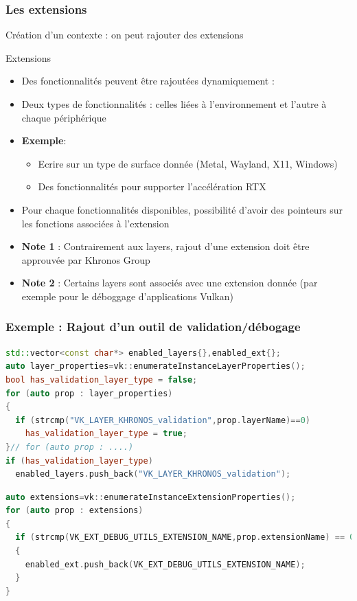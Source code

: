 \documentclass{beamer}
\begin{document}
\begin{frame}[fragile]
\frametitle{Les extensions}

Création d'un contexte : on peut rajouter des extensions 

\begin{exampleblock}{Extensions}
\begin{itemize}
\item Des fonctionnalités peuvent être rajoutées dynamiquement :
\item Deux types de fonctionnalités : celles liées à l'environnement et l'autre à chaque périphérique
\item \textcolor{NavyBlue}{\bf Exemple}:
\begin{itemize}
    \item Ecrire sur un type de surface donnée (Metal, Wayland, X11, Windows)
    \item Des fonctionnalités pour supporter l'accélération RTX
\end{itemize}
\item Pour chaque fonctionnalités disponibles, possibilité d'avoir des pointeurs sur les fonctions associées à l'extension
\item \textbf{\textcolor{BrickRed}{Note 1}} : Contrairement aux layers, rajout d'une extension doit être approuvée par Khronos Group
\item \textbf{\textcolor{BrickRed}{Note 2}} : Certains layers sont associés avec une extension donnée (par exemple pour le déboggage d'applications Vulkan)
\end{itemize}
\end{exampleblock}
\end{frame}

\begin{frame}[fragile]
\frametitle{\textcolor{BrickRed}{\bf Exemple} : Rajout d'un outil de validation/débogage}

\lstset{style=customcpp}
\begin{lstlisting}[language=C++]
std::vector<const char*> enabled_layers{},enabled_ext{};
auto layer_properties=vk::enumerateInstanceLayerProperties();
bool has_validation_layer_type = false;
for (auto prop : layer_properties)
{
  if (strcmp("VK_LAYER_KHRONOS_validation",prop.layerName)==0) 
    has_validation_layer_type = true;
}// for (auto prop : ....)
if (has_validation_layer_type)
  enabled_layers.push_back("VK_LAYER_KHRONOS_validation");
\end{lstlisting}

\begin{lstlisting}[language=C++]
auto extensions=vk::enumerateInstanceExtensionProperties();
for (auto prop : extensions)
{
  if (strcmp(VK_EXT_DEBUG_UTILS_EXTENSION_NAME,prop.extensionName) == 0)
  {
    enabled_ext.push_back(VK_EXT_DEBUG_UTILS_EXTENSION_NAME);
  }
}
\end{lstlisting}

\end{frame}
\end{document}
